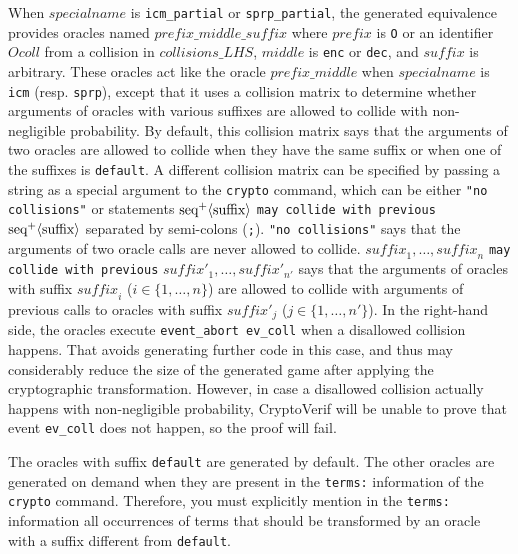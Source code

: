 \begin{itemize}
\begin{itemize}
\end{itemize}
When $\mathit{specialname}$ is \texttt{icm\_partial} or \texttt{sprp\_partial},
the generated equivalence provides oracles named
$\mathit{prefix}\texttt{\_}\mathit{middle}\texttt{\_}\mathit{suffix}$
where $\mathit{prefix}$ is \texttt{O} or an identifier $\mathit{Ocoll}$ from a collision in $\mathit{collisions\_LHS}$,
$\mathit{middle}$ is \texttt{enc} or \texttt{dec},
and $\mathit{suffix}$ is arbitrary. These oracles act like the oracle $\mathit{prefix}\texttt{\_}\mathit{middle}$ when $\mathit{specialname}$ is \texttt{icm} (resp. \texttt{sprp}), except that it uses a collision matrix to determine whether arguments
  of oracles with various suffixes are allowed to collide with non-negligible
  probability. By default, this collision matrix says that 
  the arguments of two oracles are allowed to collide when they have the same suffix
  or when one of the suffixes is \texttt{default}.
  A different collision matrix can be specified by passing
  a string as a special argument to the \texttt{crypto} command, which can be
either \texttt{"no collisions"} or statements $\textrm{seq}^+\langle\textrm{suffix}\rangle$ {\tt may collide with previous} $\textrm{seq}^+\langle\textrm{suffix}\rangle$
separated by semi-colons (\texttt{;}). \texttt{"no collisions"} says that the arguments of two oracle calls are never allowed to collide.
$\mathit{suffix}_1, \dots, \mathit{suffix}_n$ {\tt may collide with previous} $\mathit{suffix}'_1, \dots, \mathit{suffix}'_{n'}$ says that the arguments of oracles with suffix $\mathit{suffix}_i$ ($i \in \{1, \dots, n\}$) are allowed to collide with arguments of previous calls to oracles with suffix $\mathit{suffix}'_j$ ($j \in \{1, \dots, n'\}$).
In the right-hand side, the oracles execute \texttt{event\_abort ev\_coll} when a disallowed collision happens. That avoids generating further code in this case, and thus may considerably reduce the size of the generated game after applying the cryptographic transformation. However, in case a disallowed collision actually happens with non-negligible probability, CryptoVerif will be unable to prove that event \texttt{ev\_coll} does not happen, so the proof will fail.

The oracles with suffix \texttt{default} are generated
by default. The other oracles are generated on demand when
they are present in the \texttt{terms:} information of the
\texttt{crypto} command. Therefore, you must explicitly
mention in the \texttt{terms:} information all occurrences
of terms that should be transformed by an oracle with a suffix different
from \texttt{default}.



\end{itemize}
